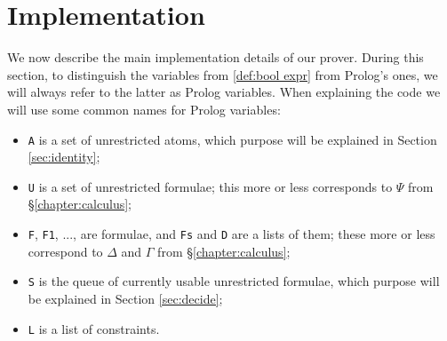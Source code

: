 \chapter{Implementation}\label{chapter:implementation}
We now describe the main implementation details of our prover.
During this section, to distinguish the variables from \ref{def:bool expr} from Prolog's ones, we will always refer to the latter as Prolog variables.
When explaining the code we will use some common names for Prolog variables:
\begin{itemize}
	\item \texttt{A} is a set of unrestricted atoms, which purpose will be explained in Section \ref{sec:identity};
	\item \texttt{U} is a set of unrestricted formulae; this more or less corresponds to $\Psi$ from \S\ref{chapter:calculus};
	\item \texttt{F}, \texttt{F1}, ..., are formulae, and \texttt{Fs} and \texttt{D} are a lists of them; these more or less correspond to $\Delta$ and $\Gamma$ from \S\ref{chapter:calculus};
	\item \texttt{S} is the queue of currently usable unrestricted formulae, which purpose will be explained in Section \ref{sec:decide};
	\item \texttt{L} is a list of constraints.
\end{itemize}

